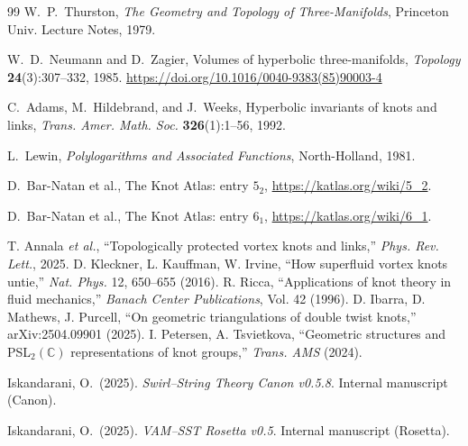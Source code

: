\documentclass[10pt,reprint,aps,onecolumn,nofootinbib]{revtex4-2}
\begin{document}
    
    \begin{thebibliography}{99}
        W.~P.~Thurston,
        \newblock \emph{The Geometry and Topology of Three-Manifolds},
        \newblock Princeton Univ. Lecture Notes, 1979.

        W.~D.~Neumann and D.~Zagier,
        \newblock Volumes of hyperbolic three-manifolds,
        \newblock \emph{Topology} \textbf{24}(3):307--332, 1985. \url{https://doi.org/10.1016/0040-9383(85)90003-4}

        C.~Adams, M.~Hildebrand, and J.~Weeks,
        \newblock Hyperbolic invariants of knots and links,
        \newblock \emph{Trans. Amer. Math. Soc.} \textbf{326}(1):1--56, 1992.

        L.~Lewin,
        \newblock \emph{Polylogarithms and Associated Functions},
        \newblock North-Holland, 1981.

        D.~Bar-Natan et al.,
        \newblock The Knot Atlas: entry \(5_2\),
        \newblock \url{https://katlas.org/wiki/5_2}.

        D.~Bar-Natan et al.,
        \newblock The Knot Atlas: entry \(6_1\),
        \newblock \url{https://katlas.org/wiki/6_1}.

         T. Annala \emph{et al.}, ``Topologically protected vortex knots and links,'' \emph{Phys. Rev. Lett.}, 2025.
         D. Kleckner, L. Kauffman, W. Irvine, ``How superfluid vortex knots untie,'' \emph{Nat. Phys.} 12, 650–655 (2016).
         R. Ricca, ``Applications of knot theory in fluid mechanics,'' \emph{Banach Center Publications}, Vol. 42 (1996).
         D. Ibarra, D. Mathews, J. Purcell, ``On geometric triangulations of double twist knots,'' arXiv:2504.09901 (2025).
         I. Petersen, A. Tsvietkova, ``Geometric structures and PSL$_2(\mathbb{C})$ representations of knot groups,'' \emph{Trans. AMS} (2024).


        Iskandarani, O.\ (2025).
        \emph{Swirl–String Theory Canon v0.5.8}.
        Internal manuscript (Canon).

        Iskandarani, O.\ (2025).
        \emph{VAM–SST Rosetta v0.5}.
        Internal manuscript (Rosetta).


\end{thebibliography}
\end{document}
